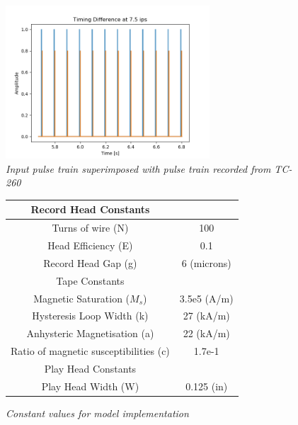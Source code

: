 \documentclass[twoside,a4paper]{article}
\begin{document}
\begin{figure}[ht]
    \center
    \includegraphics[width=3in]{../Simulations/TimingEffects/timing_diff_7-5.png}
    \caption{\label{timingSim}{\it Input pulse train superimposed with pulse train recorded from TC-260}}
\end{figure}
%
\begin{figure}[ht]
    \begin{center}
        \begin{tabular}{|| c | c ||}
            \hline
            Record Head Constants & \\
            \hline
            Turns of wire (N) & 100 \\
            Head Efficiency (E) & 0.1 \\
            Record Head Gap (g) & 6 (microns) \\
            \hline
            \hline
            \hline
            Tape Constants & \\
            \hline
            Magnetic Saturation ($M_s$) & 3.5e5 (A/m) \\
            Hysteresis Loop Width (k) & 27 (kA/m) \\
            Anhysteric Magnetisation (a) & 22 (kA/m) \\
            Ratio of magnetic susceptibilities (c) & 1.7e-1 \\
            \hline
            \hline
            \hline
            Play Head Constants & \\
            \hline
            Play Head Width (W) & 0.125 (in) \\
            \hline
        \end{tabular}
    \end{center}
    \caption{\label{constants}{\it Constant values for model implementation}}
\end{figure}
%
\end{document}
